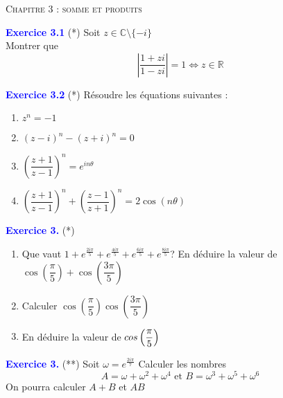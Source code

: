 \documentclass[a4paper,10pt]{article}
\renewcommand{\footrulewidth}{0.5pt} %
\begin{document}
 
\begin{multicols}{4}

\begin{center}\textsc{{\huge Chapitre 3 : somme et produits}}\end{center}

\chead{}\renewcommand{\headrulewidth}{0.4pt}\renewcommand{\footrulewidth}{0.4pt}




\textcolor{blue}{\large{\bf Exercice 3.1}} (*)
Soit $z \in \mathbb{C} \setminus \{-i\}$ \\
Montrer que 
$$ \left| \dfrac{1+zi}{1-zi} \right| = 1 \iff z \in \mathbb{R} $$



\textcolor{blue}{\large{\bf Exercice 3.2}} (*)
Résoudre les équations suivantes :
\begin{enumerate}
\item $z^n = -1$
\item $(z-i)^n-(z+i)^n=0$
\item $\left( \dfrac{z+1}{z-1} \right)^n = e^{in \theta}$
\item $\left( \dfrac{z+1}{z-1} \right)^n + \left( \dfrac{z-1}{z+1} \right)^n = 2 \cos(n \theta)$
\end{enumerate}



\textcolor{blue}{\large{\bf Exercice 3.}} (*)
\begin{enumerate}
\item Que vaut $1+e^{\frac{2i\pi}{5}}+e^{\frac{4i\pi}{5}}+e^{\frac{6i\pi}{5}}+e^{\frac{8i\pi}{5}}$? En déduire la valeur de $\cos\left( \dfrac{\pi}{5} \right)+\cos\left( \dfrac{3\pi}{5} \right)$
\item Calculer $\cos\left( \dfrac{\pi}{5} \right) \cos\left( \dfrac{3\pi}{5} \right)$
\item En déduire la valeur de $\\cos\left( \dfrac{\pi}{5} \right)$
\end{enumerate}
 

\textcolor{blue}{\large{\bf Exercice 3.}} (**)
Soit $\omega = e^{\frac{2i\pi}{7}}$
Calculer les nombres
$$ A = \omega + \omega^2 + \omega^4 \text{ et } B = \omega^3 + \omega^5 + \omega^6$$
On pourra calculer $A+B$ et $AB$


\end{multicols}
\end{document}
